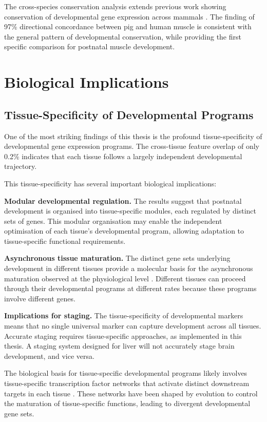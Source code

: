 The cross-species conservation analysis extends previous work showing conservation of developmental gene expression across mammals \parencite{cardoso-moreira_gene_2019}. The finding of 97\% directional concordance between pig and human muscle is consistent with the general pattern of developmental conservation, while providing the first specific comparison for postnatal muscle development.


\section{Biological Implications}\label{sec:discussion:biology}

\subsection{Tissue-Specificity of Developmental Programs}

One of the most striking findings of this thesis is the profound tissue-specificity of developmental gene expression programs. The cross-tissue feature overlap of only 0.2\% indicates that each tissue follows a largely independent developmental trajectory.

This tissue-specificity has several important biological implications:

\textbf{Modular developmental regulation.} The results suggest that postnatal development is organised into tissue-specific modules, each regulated by distinct sets of genes. This modular organisation may enable the independent optimisation of each tissue's developmental program, allowing adaptation to tissue-specific functional requirements.

\textbf{Asynchronous tissue maturation.} The distinct gene sets underlying development in different tissues provide a molecular basis for the asynchronous maturation observed at the physiological level \parencite{cardoso-moreira_gene_2019}. Different tissues can proceed through their developmental programs at different rates because these programs involve different genes.

\textbf{Implications for staging.} The tissue-specificity of developmental markers means that no single universal marker can capture development across all tissues. Accurate staging requires tissue-specific approaches, as implemented in this thesis. A staging system designed for liver will not accurately stage brain development, and vice versa.

The biological basis for tissue-specific developmental programs likely involves tissue-specific transcription factor networks that activate distinct downstream targets in each tissue \parencite{zaret_regulatory_2002}. These networks have been shaped by evolution to control the maturation of tissue-specific functions, leading to divergent developmental gene sets.


